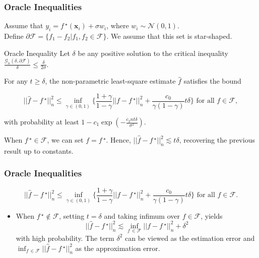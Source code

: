 \documentclass[11pt]{beamer}
\newcommand{\bx}{\mathbf{x}}
\newcommand{\cF}{\mathcal{F}}
\newcommand{\cG}{\mathcal{G}}
\newcommand{\fstar}{f\,^\star}
\newcommand{\fhat}{\widehat{f}}
\begin{document}
	\begin{frame}
		\frametitle{Oracle Inequalities}
		Assume that $y_i = \fstar(\bx_i) + \sigma w_i$, where $w_i \sim \mathcal{N}(0, 1)$.\\ Define $\partial \cF = \{f_1 - f_2 | f_1, f_2 \in \cF\}$. We assume that this set is star-shaped. 	
		\begin{block}{Oracle Inequality}
			Let $\delta$ be any positive solution to the critical inequality
			$\frac{\cG_n(\delta, \partial \cF)}{\delta} \leq \frac{\delta}{2\sigma}.$

			For any $t\geq \delta$, the non-parametric least-square estimate $\fhat$ satisfies the bound
			\begin{small}
			\begin{equation*}
				||\fhat - \fstar||_n^2 \leq \inf_{\gamma \in (0, 1)}\Big\{\frac{1+\gamma}{1-\gamma} ||f-\fstar||_n^2 + \frac{c_0}{\gamma(1-\gamma)}t\delta\Big\} \text{  for all } f\in \cF, 
			\end{equation*}
			\end{small}
			with probability at least $1 - c_1 \exp(-\frac{c_2 n t\delta}{\sigma^2})$.			
			\end{block}		
		When $\fstar \in \cF$, we can set $f=\fstar$. Hence, $||\fhat - \fstar||_n^2 \lesssim t\delta$, recovering the previous result up to constants.		
	\end{frame}
	\begin{frame}
		\frametitle{Oracle Inequalities}
		\begin{equation*}
		||\fhat - \fstar||_n^2 \leq \inf_{\gamma \in (0, 1)}\Big\{\frac{1+\gamma}{1-\gamma} ||f-\fstar||_n^2 + \frac{c_0}{\gamma(1-\gamma)}t\delta\Big\} \text{  for all } f\in \cF. 
		\end{equation*}
		\begin{itemize}
			\item When $\fstar \notin \cF$, setting $t = \delta$ and taking infimum over $f\in\cF$, yields 
			\begin{equation*}
				||\fhat - \fstar||_n^2 \lesssim \inf_{f\,\in\cF}||f - \fstar||_n^2 + \delta^2
			\end{equation*}
			with high probability. The term $\delta^2$ can be viewed as the estimation error and $\inf_{f\,\in\cF}||\fhat - \fstar||_n^2$ as the approximation error.
		\end{itemize}
	\end{frame}
\end{document}
